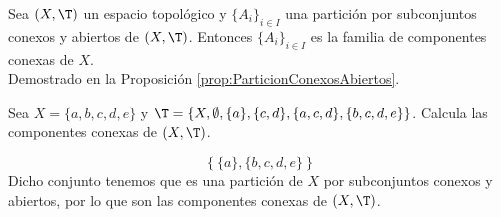 \begin{ejercicio}
    Sea $(X, \T)$ un espacio topológico y $\{A_i\}_{i \in I}$ una partición por subconjuntos conexos y abiertos de $(X, \T)$. Entonces $\{A_i\}_{i \in I}$ es la familia de componentes conexas de $X$.\\

    Demostrado en la Proposición \ref{prop:ParticionConexosAbiertos}.
\end{ejercicio}



\begin{ejercicio}
    Sea $ X = \{a, b, c, d, e\} $ y $ \T = \{X, \emptyset, \{a\}, \{c, d\}, \{a, c, d\}, \{b, c, d, e\}\} $. Calcula las componentes conexas de $(X, \T)$.

    \begin{equation*}
        \left\{\{a\}, \{b, c, d, e\}\right\}
    \end{equation*}
    Dicho conjunto tenemos que es una partición de $X$ por subconjuntos conexos y abiertos, por lo que son las componentes conexas de $(X, \T)$.
\end{ejercicio}

